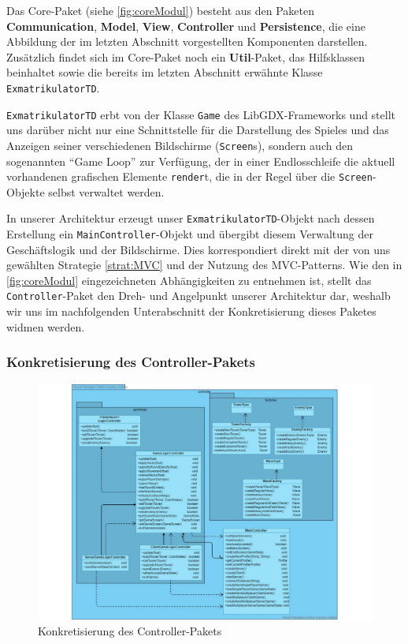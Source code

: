 \documentclass[enabledeprecatedfontcommands,fontsize=12pt,paper=a4,twoside,parskip=half]{scrartcl}
\begin{document}
Das Core-Paket (siehe \autoref{fig:coreModul}) besteht aus den Paketen \textbf{Communication}, \textbf{Model}, \textbf{View}, \textbf{Controller} und \textbf{Persistence}, die eine Abbildung der im letzten Abschnitt vorgestellten Komponenten darstellen. Zusätzlich findet sich im Core-Paket noch ein \textbf{Util}-Paket, das Hilfsklassen beinhaltet sowie die bereits im letzten Abschnitt erwähnte Klasse \texttt{ExmatrikulatorTD}.

\texttt{ExmatrikulatorTD} erbt von der Klasse \texttt{Game} des LibGDX-Frameworks und stellt uns darüber nicht nur eine Schnittstelle für die Darstellung des Spieles und das Anzeigen seiner verschiedenen Bildschirme (\texttt{Screen}s), sondern auch den sogenannten \enquote{Game Loop} zur Verfügung, der in einer Endlosschleife die aktuell vorhandenen grafischen Elemente \texttt{render}t, die in der Regel über die \texttt{Screen}-Objekte selbst verwaltet werden.

In unserer Architektur erzeugt unser \texttt{ExmatrikulatorTD}-Objekt nach dessen Erstellung ein \texttt{MainController}-Objekt und übergibt diesem Verwaltung der Geschäftslogik und der Bildschirme. Dies korrespondiert direkt mit der von uns gewählten Strategie \ref{strat:MVC} und der Nutzung des MVC-Patterns. Wie den in \autoref{fig:coreModul} eingezeichneten Abhängigkeiten zu entnehmen ist, stellt das \texttt{Controller}-Paket den Dreh- und Angelpunkt unserer Architektur dar, weshalb wir uns im nachfolgenden Unterabschnitt der Konkretisierung dieses Paketes widmen werden.

\subsubsection{Konkretisierung des Controller-Pakets}
\begin{figure}[h]
    \centering
    \includegraphics[width=\textwidth]{Bilder/KlassendiagramController.pdf}
    \caption{Konkretisierung des Controller-Pakets}
    \label{fig:contrPak}
\end{figure}
\end{document}
